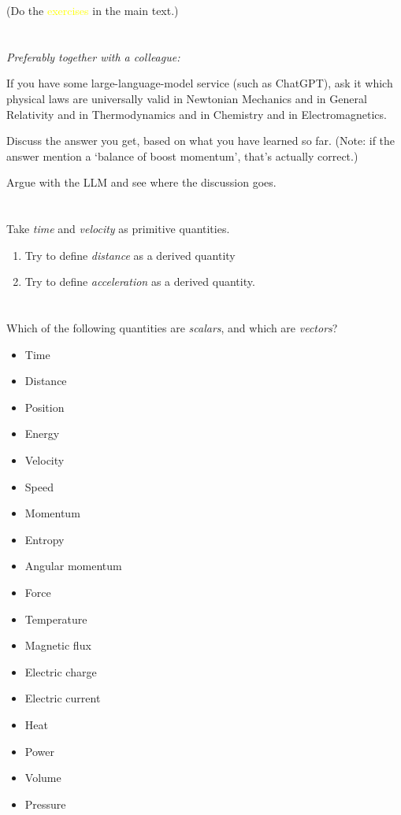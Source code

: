 \documentclass[a4paper,12pt,%
onecolumn,oneside,%
british%
]{memoir}
\renewcommand*{\|}[1][]{\nonscript\:#1\vert\nonscript\:\mathopen{}}
\begin{document}
(Do the \textcolor{yellow}{exercises} in the main text.)

\section{}
\label{sec:chatgpt_laws}

\emph{Preferably together with a colleague:}

If you have some large-language-model service (such as ChatGPT), ask it which physical laws are universally valid in Newtonian Mechanics and in General Relativity and in Thermodynamics and in Chemistry and in Electromagnetics.

Discuss the answer you get, based on what you have learned so far. (Note: if the answer mention a \enquote*{balance of boost momentum}, that's actually correct.)

Argue with the LLM and see where the discussion goes.



\section{}\label{sec:time_vel_primitive}

Take \emph{time} and \emph{velocity} as primitive quantities.
\begin{enumerate}[exerc]
\item Try to define \emph{distance} as a derived quantity

\item Try to define \emph{acceleration} as a derived quantity.
\end{enumerate}

\section{}
\label{sec:scalar_vect_quants}

Which of the following quantities are \emph{scalars}, and which are \emph{vectors}?
\begin{itemize}[noitemsep]
\item Time
\item Distance
\item Position
\item Energy
\item Velocity
\item Speed
\item Momentum
\item Entropy
\item Angular momentum
\item Force
\item Temperature
\item Magnetic flux
\item Electric charge
\item Electric current
\item Heat
\item Power
\item Volume
\item Pressure
\end{itemize}
\end{document}
